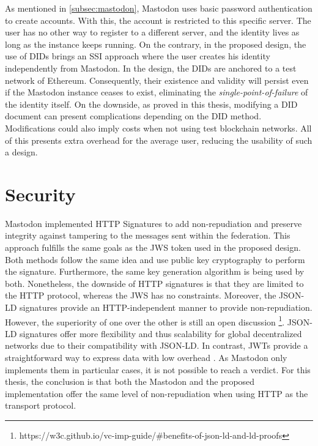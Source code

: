As mentioned in \ref{subsec:mastodon}, Mastodon uses basic password authentication to create accounts. With this, the account is restricted to this specific server. The user has no other way to register to a different server, and the identity lives as long as the instance keeps running. On the contrary, in the proposed design, the use of DIDs brings an SSI approach where the user creates his identity independently from Mastodon. In the design, the DIDs are anchored to a test network of Ethereum. Consequently, their existence and validity will persist even if the Mastodon instance ceases to exist, eliminating the \emph{single-point-of-failure} of the identity itself. On the downside, as proved in this thesis, modifying a DID document can present complications depending on the DID method. Modifications could also imply costs when not using test blockchain networks. All of this presents extra overhead for the average user, reducing the usability of such a design. 

\section{Security}
Mastodon implemented HTTP Signatures to add non-repudiation and preserve integrity against tampering to the messages sent within the federation. This approach fulfills the same goals as the JWS token used in the proposed design. Both methods follow the same idea and use public key cryptography to perform the signature. Furthermore, the same key generation algorithm is being used by both. Nonetheless, the downside of HTTP signatures is that they are limited to the HTTP protocol, whereas the JWS has no constraints. 
Moreover, the JSON-LD signatures provide an HTTP-independent manner to provide non-repudiation. However, the superiority of one over the other is still an open discussion \footnote{https://w3c.github.io/vc-imp-guide/\#benefits-of-json-ld-and-ld-proofs}. JSON-LD signatures offer more flexibility and thus scalability for global decentralized networks due to their compatibility with JSON-LD. In contrast, JWTs provide a straightforward way to express data with low overhead \cite{chadwick_longley_sporny_terbu_zagidulin_zundel_2022}. As Mastodon only implements them in particular cases, it is not possible to reach a verdict. 
For this thesis, the conclusion is that both the Mastodon and the proposed implementation offer the same level of non-repudiation when using HTTP as the transport protocol. 


